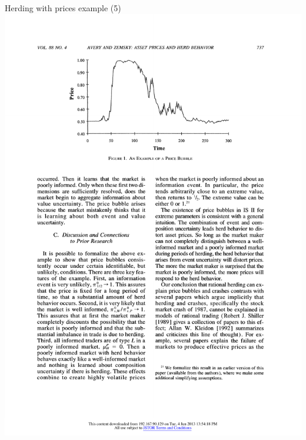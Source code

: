 \documentclass[english,10pt
,aspectratio=169
]{beamer}
\begin{document}
\begin{frame}{Herding with prices example (5)}
	\includegraphics[width=0.4\paperwidth]{pics/PriceBubble}

\end{frame}
\end{document}
